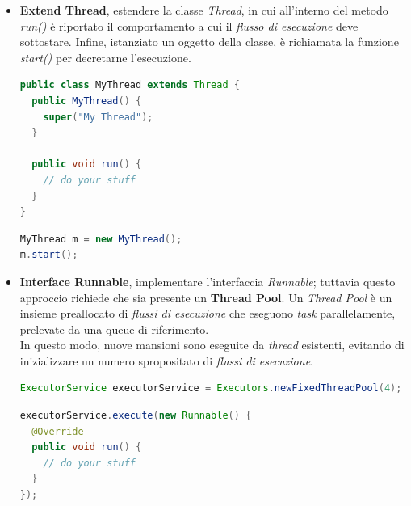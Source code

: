 \documentclass{article}
\begin{document}
\begin{itemize}[label={-}]
  \itemsep0em
  \item \textbf{Extend Thread}, estendere la classe \textit{Thread}, in cui all'interno del metodo \textit{run()} è riportato il comportamento a cui il \textit{flusso di esecuzione} deve sottostare. Infine, istanziato un oggetto della classe, è richiamata la funzione \textit{start()} per decretarne l'esecuzione.  
  \begin{lstlisting}[language=JAVA]
public class MyThread extends Thread {
  public MyThread() {
    super("My Thread");
  }

  public void run() {
    // do your stuff
  }
}
\end{lstlisting}
\begin{lstlisting}[language=JAVA]
MyThread m = new MyThread();
m.start();
\end{lstlisting}
  \item \textbf{Interface Runnable}, implementare l'interfaccia \textit{Runnable}; tuttavia questo approccio richiede che sia presente un \textbf{Thread Pool}. Un \textit{Thread Pool} è un insieme preallocato di \textit{flussi di esecuzione} che eseguono \textit{task} parallelamente, prelevate da una queue di riferimento.\vspace*{7pt}\\
  In questo modo, nuove mansioni sono eseguite da \textit{thread} esistenti, evitando di inizializzare un numero spropositato di \textit{flussi di esecuzione}.
  \begin{lstlisting}[language=JAVA]
ExecutorService executorService = Executors.newFixedThreadPool(4);
  \end{lstlisting}
\begin{lstlisting}[language=JAVA]
executorService.execute(new Runnable() {
  @Override
  public void run() {
    // do your stuff
  }
});
\end{lstlisting}
\end{itemize}
\end{document}
